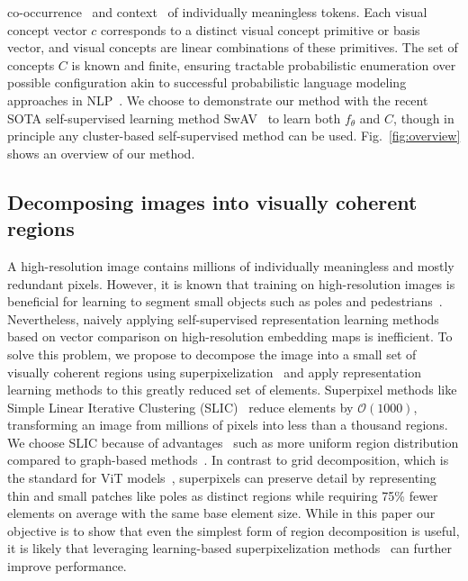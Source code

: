 \documentclass{bmvc2k}
\begin{document}
co-occurrence~\cite{Harris1954DistributionalHypothesis} and context~\cite{Devlin2019BERT,Peters2018ELMO} of individually meaningless tokens. Each visual concept vector $c$ corresponds to a distinct visual concept primitive or basis vector, and visual concepts are linear combinations of these primitives. The set of concepts $C$ is known and finite, ensuring tractable probabilistic enumeration over possible configuration akin to successful probabilistic language modeling approaches in NLP~\cite{Devlin2019BERT, Radford2018GPT}. We choose to demonstrate our method with the recent SOTA self-supervised learning method SwAV~\cite{Caron2020SwAV} to learn both $f_{\theta}$ and $C$, though in principle any cluster-based self-supervised method can be used. Fig.~\ref{fig:overview} shows an overview of our method.

\subsection{Decomposing images into visually coherent regions}
A high-resolution image contains millions of individually meaningless and mostly redundant pixels. However, it is known that training on high-resolution images is beneficial for learning to segment small objects such as poles and pedestrians~\cite{Chen2018DeepLabV2}. Nevertheless, naively applying self-supervised representation learning methods based on vector comparison on high-resolution embedding maps is inefficient. To solve this problem, we propose to decompose the image into a small set of visually coherent regions using superpixelization~\cite{Ren2003Superpixels} and apply representation learning methods to this greatly reduced set of elements.
Superpixel methods like Simple Linear Iterative Clustering (SLIC)~\cite{Achanta2010SLICSuperpixels} reduce elements by $\mathcal{O}(1000)$, transforming an image from millions of pixels into less than a thousand regions. We choose SLIC because of advantages~\cite{AchantaSLICSOTA} such as more uniform region distribution compared to graph-based methods~\cite{Pedro2004FHsuperpixels}. 
In contrast to grid decomposition, which is the standard for ViT models~\cite{Dosovitskiy2021ViT, Caron2021DINO}, superpixels can preserve detail by representing thin and small patches like poles as distinct regions while requiring 75\% fewer elements on average with the same base element size.
While in this paper our objective is to show that even the simplest form of region decomposition is useful, it is likely that leveraging learning-based superpixelization methods~\cite{Arbelaez2014MGC, Locatello2020SlotAttention, Weinzaepfel2022Superfeatures} can further improve performance.
\end{document}
